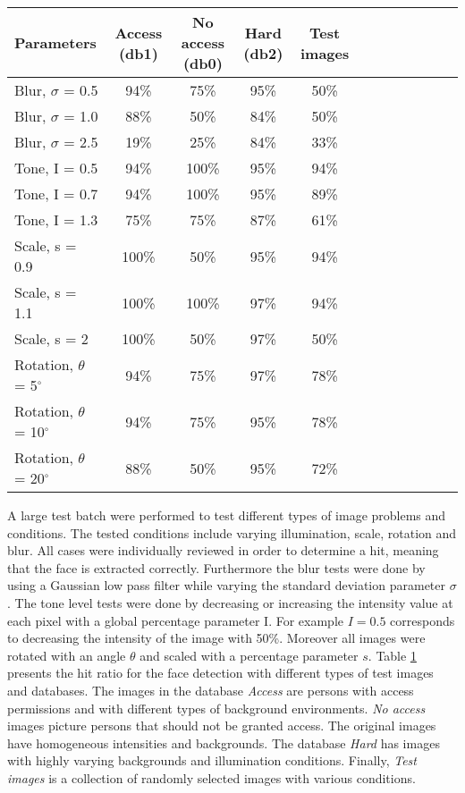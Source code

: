 \begin{table}[H]
\small
  \label{tb:result}
\begin{tabular}{l*{10}{c}r}
\hline
Parameters & Access (db1) & No access (db0) & Hard (db2) & Test images \\
\hline
Blur, $\sigma$ = 0.5  & 94\% 	& 75\% 		& 95\% 		& 50\%  \\ \hline
Blur, $\sigma$ = 1.0  & 88\% 		& 50\% 		& 84\% 	& 50\% \\ \hline
Blur, $\sigma$ = 2.5  & 19\% 	& 25\% 		& 84\% 		& 33\% \\ \hline
Tone, I = 0.5  		& 94\% 	& 100\%	 		& 95\%		& 94\% \\ \hline
Tone, I = 0.7  		& 94\%		& 100\%   	    & 95\% 	& 89\% 	\\ \hline
Tone, I = 1.3  		& 75\%		& 75\%		& 87\% 	& 61\% 	 \\ \hline
Scale, s = 0.9 		& 100\% 		& 50\% 		& 95\% 	& 94\% 	 \\ \hline
Scale, s = 1.1  		& 100\% 		& 100\% 		& 97\% 	& 94\%		  \\ \hline
Scale, s = 2  			& 100\% 		& 50\%		& 97\% 	& 50\%		  \\ \hline
Rotation, $\theta$ = 5$^{\circ}$  	& 94\% 	& 75\%		& 97\% 		& 78\% 	 \\ \hline
Rotation, $\theta$ = 10$^{\circ}$   & 94\% 	& 75\%		& 95\% 		& 78\% 	 \\ \hline
Rotation, $\theta$ = 20$^{\circ}$  & 88\% 		& 50\%		& 95\% 	& 72\% 	 \\ \hline
\end{tabular}
\end{table}

A large test batch were performed to test different types of image problems and conditions. The tested conditions include varying illumination, scale, rotation and blur. All cases were individually reviewed in order to determine a hit, meaning that the face is extracted correctly. Furthermore the blur tests were done by using a Gaussian low pass filter while varying the standard deviation parameter $\sigma$.
The tone level tests were done by decreasing or increasing the intensity value at each pixel with a global percentage parameter I. For example $I = 0.5$ corresponds to decreasing the intensity of the image with 50\%.
Moreover all images were rotated with an angle $\theta$ and scaled with a percentage parameter $s$.
\newline
\indent Table \ref{tb:result} presents the hit ratio for the face detection with different types of test images and databases.
The images in the database \textit{Access} are persons with access permissions and with different types of background environments.
\textit{No access} images picture persons that should not be granted access. The original images have homogeneous intensities and backgrounds.
The database \textit{Hard} has images with highly varying backgrounds and illumination conditions. Finally, \textit{Test images} is a collection of randomly selected images with various conditions.
